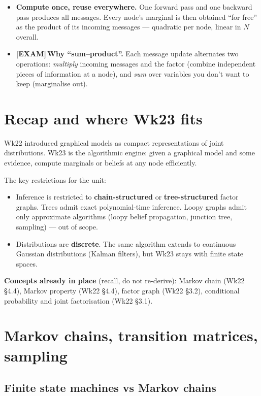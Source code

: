 \documentclass[11pt, a4paper]{article}
\newcommand{\examflag}{\textcolor{tipBd}{\textbf{[EXAM]}}\,}
\begin{document}
\begin{tldrbox}
\begin{itemize}[leftmargin=*]
  \item \textbf{Compute once, reuse everywhere.} One forward pass and one backward pass produces all messages. Every node's marginal is then obtained ``for free'' as the product of its incoming messages — quadratic per node, linear in $N$ overall.
  \item \examflag{}\textbf{Why ``sum--product''.} Each message update alternates two operations: \emph{multiply} incoming messages and the factor (combine independent pieces of information at a node), and \emph{sum} over variables you don't want to keep (marginalise out).
\end{itemize}
\end{tldrbox}

\section{Recap and where Wk23 fits}

Wk22 introduced graphical models as compact representations of joint distributions. Wk23 is the algorithmic engine: given a graphical model and some evidence, compute marginals or beliefs at any node efficiently.

The key restrictions for the unit:
\begin{itemize}
  \item Inference is restricted to \textbf{chain-structured} or \textbf{tree-structured} factor graphs. Trees admit exact polynomial-time inference. Loopy graphs admit only approximate algorithms (loopy belief propagation, junction tree, sampling) — out of scope.
  \item Distributions are \textbf{discrete}. The same algorithm extends to continuous Gaussian distributions (Kalman filters), but Wk23 stays with finite state spaces.
\end{itemize}

\textbf{Concepts already in place} (recall, do not re-derive): Markov chain (Wk22 §4.4), Markov property (Wk22 §4.4), factor graph (Wk22 §3.2), conditional probability and joint factorisation (Wk22 §3.1).

\section{Markov chains, transition matrices, sampling}

\subsection{Finite state machines vs Markov chains}
\end{document}
